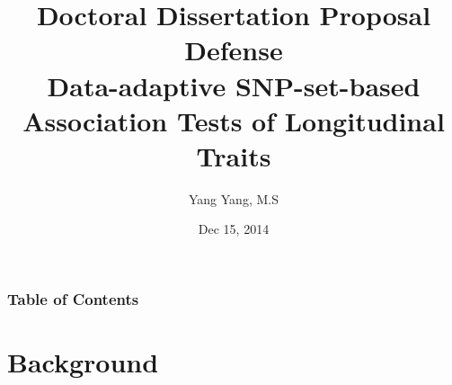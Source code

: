 \documentclass[compress]{beamer}
\begin{document}
\title[Proposal Defense] %
{Doctoral Dissertation Proposal Defense\\Data-adaptive SNP-set-based Association Tests of Longitudinal Traits }
\author[ Yang Yang, M.S] %
{Yang Yang, M.S}
\date[Dec.15 2014] %
{Dec 15, 2014}


\frame{\titlepage}


\begin{frame}
\frametitle{Table of Contents}
\tableofcontents
\end{frame}


\section{Background}
\end{document}
